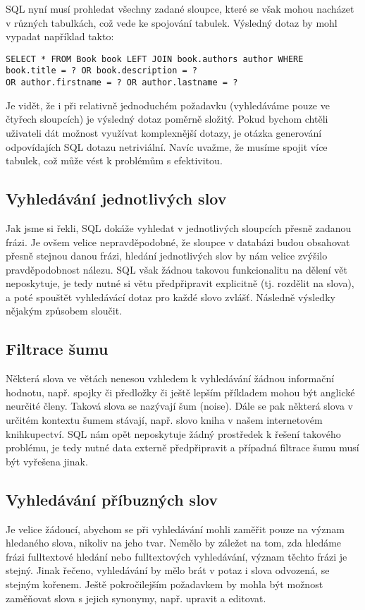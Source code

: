 \documentclass[11pt,draft,oneside]{fithesis2}
\begin{document}
SQL nyní musí prohledat všechny zadané sloupce, které se však mohou nacházet v různých tabulkách, což vede ke spojování tabulek. Výsledný dotaz by mohl vypadat například takto:
\begin{verbatim}
SELECT * FROM Book book LEFT JOIN book.authors author WHERE 
book.title = ? OR book.description = ? 
OR author.firstname = ? OR author.lastname = ?
\end{verbatim}

Je vidět, že i při relativně jednoduchém požadavku (vyhledáváme pouze ve čtyřech sloupcích) je výsledný dotaz poměrně složitý. Pokud bychom chtěli uživateli dát možnost využívat komplexnější
dotazy, je otázka generování odpovídajích SQL dotazu netriviální. Navíc uvažme, že musíme spojit více tabulek, což může vést k problémům s efektivitou.

\subsection{Vyhledávání jednotlivých slov}
Jak jsme si řekli, SQL dokáže vyhledat v jednotlivých sloupcích přesně zadanou frázi. Je ovšem velice nepravděpodobné, že sloupce v databázi budou obsahovat přesně stejnou danou frázi, 
hledání jednotlivých slov by nám velice zvýšilo pravděpodobnost nálezu. SQL však žádnou takovou funkcionalitu na dělení vět neposkytuje, je tedy nutné si větu předpřipravit explicitně (tj. rozdělit na slova),
a poté spouštět vyhledávácí dotaz pro každé slovo zvlášť. Následně výsledky nějakým způsobem sloučit.

\subsection{Filtrace šumu}
Některá slova ve větách nenesou vzhledem k vyhledávání žádnou informační hodnotu, např. spojky či předložky či ještě lepším příkladem mohou být anglické neurčité členy. Taková slova se nazývají šum (noise). Dále se pak některá slova v určitém kontextu
šumem stávají, např. slovo kniha v našem internetovém knihkupectví. SQL nám opět neposkytuje žádný prostředek k řešení takového problému, je tedy nutné data externě předpřipravit a případná filtrace šumu musí být vyřešena jinak.

\subsection{Vyhledávání příbuzných slov}
Je velice žádoucí, abychom se při vyhledávání mohli zaměřit pouze na význam hledaného slova, nikoliv na jeho tvar. Nemělo by záležet na tom, zda hledáme frázi fulltextové hledání nebo fulltextových vyhledávání, význam těchto frázi
je stejný. Jinak řečeno, vyhledávání by mělo brát v potaz i slova odvozená, se stejným kořenem. Ještě pokročilejším požadavkem by mohla být možnost zaměňovat slova s jejich synonymy, např. upravit a editovat.
\end{document}
